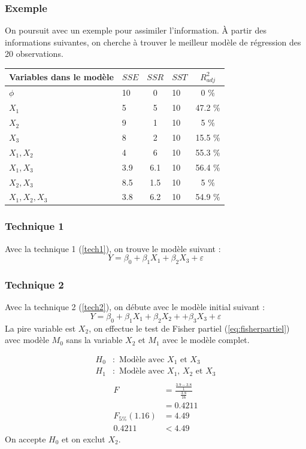 \documentclass[11pt,french]{report}
\begin{document}
\bigskip
\subsubsection*{Exemple}
\label{exempleTechn}
On poursuit avec un exemple pour assimiler l'information. \newline
À partir des informations suivantes, on cherche à trouver le meilleur modèle de régression des 20 observations.
\bigskip

\begin{tabularx}{\linewidth}{|X|b|c|b|c|}
\hline
\rowcolor{codegray}
Variables dans le modèle & $SSE$ & $SSR$ & $SST$ & $R^2_{adj}$ \\
\hline
$\phi$ & 10 & 0 & 10 & 0 \% \\
$X_1$ & 5 & 5 & 10 & 47.2 \% \\
$X_2$ & 9 & 1 & 10 & 5 \% \\
$X_3$ & 8 & 2 & 10 & 15.5 \% \\
$X_1, X_2$ & 4 & 6 & 10 & 55.3 \% \\
$X_1, X_3$ & 3.9 & 6.1 & 10 & 56.4 \% \\
$X_2, X_3$ & 8.5 & 1.5 & 10 & 5 \% \\
$X_1, X_2, X_3$ & 3.8 & 6.2 & 10 & 54.9 \% \\
\hline
\end{tabularx}

\subsubsection*{Technique 1}
Avec la technique 1 (\ref{tech1}), on trouve le modèle suivant :
$$
Y = \beta_0 + \beta_1X_1 + \beta_2X_3 + \varepsilon
$$

\subsubsection*{Technique 2}
Avec la technique 2 (\ref{tech2}), on débute avec le modèle initial suivant :
$$
Y = \beta_0 + \beta_1X_1 + \beta_2X_2 + + \beta_3X_3 + \varepsilon
$$
La pire variable est $X_2$, on effectue le test de Fisher partiel (\ref{eq:fisherpartiel}) avec modèle $M_0$ sans la variable $X_2$ et $M_1$ avec le modèle complet. 

\begin{align*}
H_0 &: \text{ Modèle avec $X_1$ et $X_3$} \\
H_1 &: \text{ Modèle avec $X_1$, $X_2$ et $X_3$} \\
\end{align*}
\begin{align*}
F &= \frac{\frac{3.9-3.8}{1}}{\frac{3.8}{16}} \\
&= 0.4211 \\
F_{5 \%}(1.16) &= 4.49 \\
0.4211 &< 4.49
\end{align*}
On accepte $H_0$ et on exclut $X_2$. \newline
\end{document}
